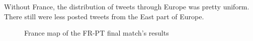 \documentclass[a4paper,11pt]{report}
\begin{document}
Without France, the distribution of tweets through Europe was pretty uniform. There still were less posted tweets from the East part of Europe.
\begin{figure}[H]
\vspace{-5pt}
\begin{center}
\vspace{-20pt}
\caption{France map of the FR-PT final match's results}
\end{center}
\end{figure}
\vspace{-10pt}
\end{document}
